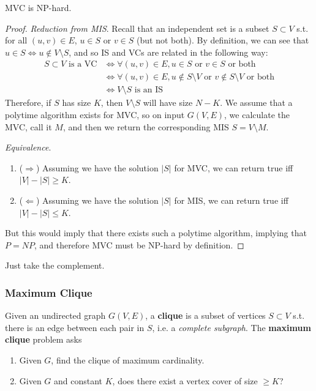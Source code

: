     \begin{theorem}[MVC]
      \label{thm:mvc}
      MVC is NP-hard. 
    \end{theorem}
    \begin{proof}
      \textit{Reduction from MIS}. Recall that an independent set is a subset $S \subset V$ s.t. for all $(u, v) \in E$, $u \in S$ or $v \in S$ (but not both). By definition, we can see that $u \in S \iff u \not\in V \setminus S$, and so IS and VCs are related in the following way: 
      \begin{align}
        S \subset V \text{ is a VC} & \iff \forall (u, v) \in E, u \in S \text{ or } v \in S \text{ or both} \\
                                    & \iff \forall (u, v) \in E, u \not\in S \setminus V \text{ or } v \not\in S \setminus V \text{ or both} \\
                                    & \iff V \setminus S \text{ is an IS}
      \end{align}
      Therefore, if $S$ has size $K$, then $V \setminus S$ will have size $N - K$. We assume that a polytime algorithm exists for MVC, so on input $G(V, E)$, we calculate the MVC, call it $M$, and then we return the corresponding MIS $S = V \setminus M$. 

      \textit{Equivalence}. 
      \begin{enumerate}
        \item ($\Rightarrow$) Assuming we have the solution $|S|$ for MVC, we can return true iff $|V| - |S| \geq K$. 
        \item ($\Leftarrow$) Assuming we have the solution $|S|$ for MIS, we can return true iff $|V| - |S| \leq K$. 
      \end{enumerate}
      But this would imply that there exists such a polytime algorithm, implying that $P = NP$, and therefore MVC must be NP-hard by definition. 
    \end{proof}

    \begin{example}
      \label{ex:reduction-from-independent-set-to-vertex-cover}
      Just take the complement. 
    \end{example}

  \subsubsection{Maximum Clique}

    \begin{definition}
      \label{def:max-clique}
      Given an undirected graph $G(V, E)$, a \textbf{clique} is a subset of vertices $S \subset V$ s.t. there is an edge between each pair in $S$, i.e. a \textit{complete subgraph}. The \textbf{maximum clique} problem asks 
      \begin{enumerate}
        \item Given $G$, find the clique of maximum cardinality. 
        \item Given $G$ and constant $K$, does there exist a vertex cover of size $\geq K$? 
      \end{enumerate}
    \end{definition} 

